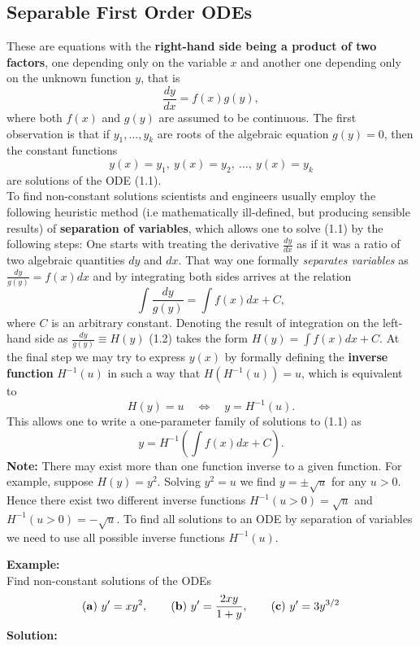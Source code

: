 \documentclass[11pt,a4paper,twoside]{article}
\begin{document}
	\subsection{Separable First Order ODEs}
	These are equations with the \textbf{right-hand side being a product of two factors}, one
	depending only on the variable $x$ and another one depending only on the unknown function $y$, that is
	\begin{equation}
			\frac{dy}{dx} = f(x)g(y),
	\end{equation}
	where both $f(x)$ and $g(y)$ are assumed to be continuous. The first observation is that if $y_1, \ldots , y_k$ are roots of the algebraic equation $g(y) = 0$, then the constant functions
	$$
	y(x) = y_1,\ y(x) = y_2,\ \ldots ,\ y(x) = y_k
	$$
	are solutions of the ODE (1.1).\\
	To find non-constant solutions scientists and engineers usually employ the following heuristic method (i.e mathematically ill-defined, but producing sensible results) of \textbf{separation of variables}, which allows one to solve (1.1) by the following steps: One starts with treating the derivative $\frac{dy}{dx}$ as if it was a ratio of two algebraic quantities $dy$ and $dx$. That way one formally \textit{separates variables} as $\frac{dy}{g(y)} = f(x) dx$ and by integrating both sides arrives at the
	relation
	\begin{equation}
			\int \frac{dy}{g(y)} = \int f(x)dx + C,
	\end{equation}
	where $C$ is an arbitrary constant. Denoting the result of integration on the left-hand side as $\frac{dy}{g(y)} \equiv H(y)$  (1.2) takes the form $H(y) = \int f(x)dx + C$. At the final step we may try to express $y(x)$ by formally defining the \textbf{inverse function} $H^{-1}(u)$ in such a way that $H(H^{-1}(u)) = u$, which is equivalent to
	$$
	H(y) = u \quad \Leftrightarrow \quad y = H^{-1}(u). 
	$$
	This allows one to write a one-parameter family of solutions to (1.1) as
	$$
	y = H^{-1}\left(\int f(x)dx + C \right).
	$$
	\textbf{Note:} There may exist more than one function inverse to a given function. For example, suppose $H(y) = y^2$. Solving $y^2 = u$ we find $y = \pm \sqrt{u}$ for any $u > 0$. Hence there exist two different inverse functions $H^{-1}(u > 0) = \sqrt{u}$ and $H^{-1}(u > 0) = -\sqrt{u}$. To find all solutions to an ODE by separation of variables we need to use all possible inverse functions $H^{-1}(u)$.\par
	\textbf{Example:}\\
	Find non-constant solutions of the ODEs
	$$
	\text{(\textbf{a})}\ y^\prime = xy^2, \qquad
	\text{(\textbf{b})}\ y^\prime = \frac{2xy}{1+y}, \qquad
	\text{(\textbf{c})}\ y^\prime = 3y^{3/2}
	$$
	\textbf{Solution:}\\
\end{document}

